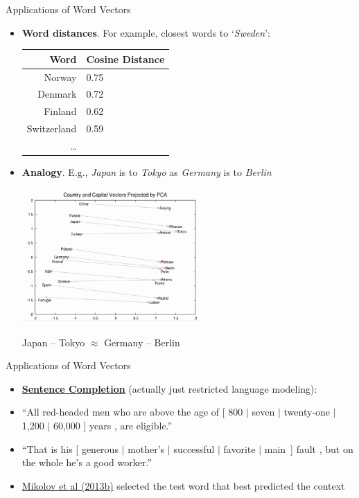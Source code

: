 \documentclass[xcolor=pdftex,x11names,table,hyperref]{beamer}
\begin{document}
\begin{frame}{Applications of Word Vectors}
\begin{itemize}
	\item \textbf{Word distances}.  For example, closest words to `\textit{Sweden}':
		\begin{center}
		\begin{footnotesize}
		\begin{tabular}{rl}
			\bf Word & \bf Cosine Distance \\
			\hline
			Norway & 0.75 \\
			Denmark & 0.72 \\
			Finland & 0.62 \\
			Switzerland & 0.59 \\
			\ldots & \\
		\end{tabular}
		\end{footnotesize}
		\end{center}
		\pause
	\item \textbf{Analogy}.  E.g., \textit{Japan} is to \textit{Tokyo} as \textit{Germany} is to \textit{Berlin}
		\begin{center}
		\includegraphics[width=0.54\textwidth]{images/countries_capitals.png} 
		\end{center}
		\pause
		{\scriptsize Japan -- Tokyo $\approx$ Germany -- Berlin }
\end{itemize}
\end{frame}


\begin{frame}{Applications of Word Vectors}
\begin{itemize}
	\item \textbf{\href{http://research.microsoft.com/en-us/um/people/cburges/tech_reports/msr-tr-2011-129.pdf}{Sentence Completion}} (actually just restricted language modeling):
	\item ``All red-headed men who are above the age of {\color{darkblue} [ 800 $|$ seven $|$ twenty-one $|$ 1,200 $|$ 60,000 ]} years , are eligible.''
	\item ``That is his {\color{darkblue} [ generous $|$ mother's $|$ successful $|$ favorite $|$ main~]} fault , but on the whole he's a good worker.''
	\pause
	\item \href{http://arxiv.org/pdf/1301.3781.pdf}{Mikolov et al (2013b)} selected the test word that best predicted the context
\end{itemize}
\end{frame}
\end{document}

